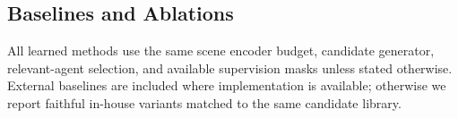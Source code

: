 \documentclass[10pt]{article}
\begin{document}
\begin{table}[t]
\centering
\caption{Same-root intervention dataset summary. Values are placeholders.}
\label{tab:exp_data_summary}
\end{table}

\subsection{Baselines and Ablations}
\label{sec:exp_baselines}

All learned methods use the same scene encoder budget, candidate generator, relevant-agent selection, and available supervision masks unless stated otherwise. External baselines are included where implementation is available; otherwise we report faithful in-house variants matched to the same candidate library.
\end{document}

